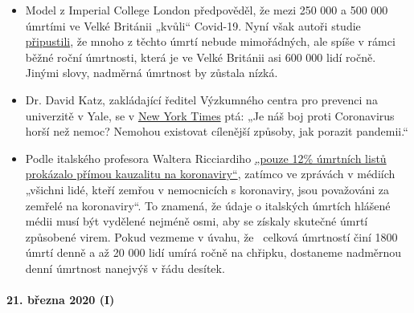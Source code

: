 \begin{itemize}
\tightlist
\item
  Model z Imperial College London předpověděl, že mezi 250 000 a 500 000
  úmrtími ve Velké Británii „kvůli`` Covid-19. Nyní však autoři studie
  \href{https://www.bbc.com/news/health-51979654}{připustili}, že mnoho
  z těchto úmrtí nebude mimořádných, ale spíše v rámci běžné roční
  úmrtnosti, která je ve Velké Británii asi 600 000 lidí ročně. Jinými
  slovy, nadměrná úmrtnost by zůstala nízká.
\item
  Dr. David Katz, zakládající ředitel Výzkumného centra pro prevenci na
  univerzitě v Yale, se v
  \href{https://www.nytimes.com/2020/03/20/opinion/coronavirus-pandemic-social-distancing.html}{New
  York Times} ptá: „Je náš boj proti Coronavirus horší než nemoc?
  Nemohou existovat cílenější způsoby, jak porazit pandemii.``
\item
  Podle italského profesora Waltera Ricciardiho
  \href{https://web.archive.org/web/20200324214448/https:/www.telegraph.co.uk/global-health/science-and-disease/have-many-coronavirus-patients-died-italy/}{„pouze
  12\% úmrtních listů prokázalo přímou kauzalitu na koronaviry``},
  zatímco ve zprávách v médiích „všichni lidé, kteří zemřou v
  nemocnicích s koronaviry, jsou považováni za zemřelé na koronaviry``.
  To znamená, že údaje o italských úmrtích hlášené médii musí být
  vydělené nejméně osmi, aby se získaly skutečné úmrtí způsobené virem.
  Pokud vezmeme v úvahu, že ~celková úmrtností činí 1800 úmrtí denně a
  až 20 000 lidí umírá ročně na chřipku, dostaneme nadměrnou denní
  úmrtnost nanejvýš v řádu desítek.\\
\end{itemize}

\hypertarget{21-bux159ezna-2020-i}{%
\paragraph{21. března 2020 (I)}\label{21-bux159ezna-2020-i}}

